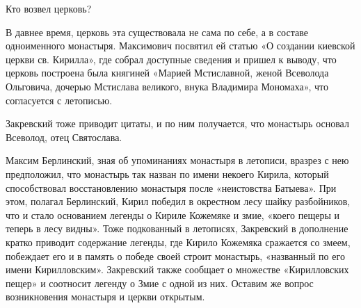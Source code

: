 Кто возвел церковь?

В давнее время, церковь эта существовала не сама по себе, а в составе одноименного монастыря. Максимович посвятил ей статью «О создании киевской церкви св. Кирилла», где собрал доступные сведения и пришел к выводу, что церковь построена была княгиней «Марией Мстиславной, женой Всеволода Ольговича, дочерью Мстислава великого, внука Владимира Мономаха», что согласуется с летописью.

Закревский тоже приводит цитаты, и по ним получается, что монастырь основал Всеволод, отец Святослава.

Максим Берлинский, зная об упоминаниях монастыря в летописи, вразрез с нею предположил, что монастырь так назван по имени некоего Кирила, который способствовал восстановлению монастыря после «неистовства Батыева». При этом, полагал Берлинский, Кирил победил в окрестном лесу шайку разбойников, что и стало основанием легенды о Кириле Кожемяке и змие, «коего пещеры и теперь в лесу видны». Тоже подкованный в летописях, Закревский в дополнение кратко приводит содержание легенды, где Кирило Кожемяка сражается со змеем, побеждает его и в память о победе своей строит монастырь, «названный по его имени Кирилловским». Закревский также сообщает о множестве «Кирилловских пещер» и соотносит легенду о Змие с одной из них. Оставим же вопрос возникновения монастыря и церкви открытым.







